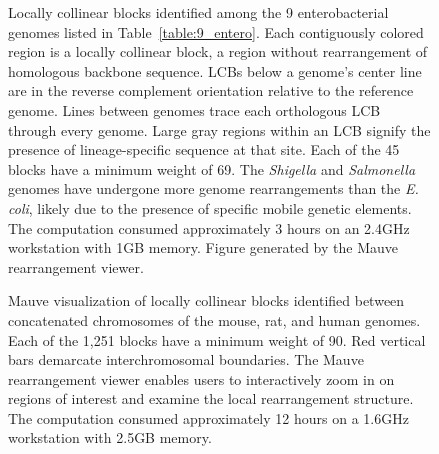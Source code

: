\documentclass[titlepage,11pt]{article}
\begin{document}
\begin{figure}
\centering
{}
\caption{\label{fig:entero_alignment}Locally collinear blocks identified
among the 9 enterobacterial genomes listed in Table~\ref{table:9_entero}.  Each
contiguously colored region is a locally collinear block, a region without
rearrangement of homologous backbone sequence.  LCBs below a genome's
center line are in the reverse complement orientation relative to the reference
genome.  Lines between genomes trace each orthologous LCB through every genome.
Large gray regions within an LCB signify the presence of lineage-specific
sequence at that site.  Each of
the 45 blocks have a minimum weight of 69.  The \textit{Shigella} and
\textit{Salmonella} genomes have undergone more genome rearrangements than the
\textit{E. coli}, likely due to the presence of specific mobile genetic elements.
The computation consumed approximately 3 hours on an 2.4GHz workstation with
1GB memory.  Figure generated by the Mauve rearrangement viewer.
}
\end{figure}

\begin{figure}
\centering
{}
\caption{\label{fig:hmr}Mauve visualization of locally collinear blocks identified
between concatenated chromosomes of the mouse, rat, and human genomes.  Each of
the 1,251 blocks have a minimum weight of 90.  Red vertical bars demarcate
interchromosomal boundaries.  The Mauve rearrangement viewer enables users to
interactively zoom in on regions of interest and examine the local rearrangement
structure. The computation consumed
approximately 12 hours on a 1.6GHz workstation with 2.5GB memory.
}
\end{figure}

\end{document}
